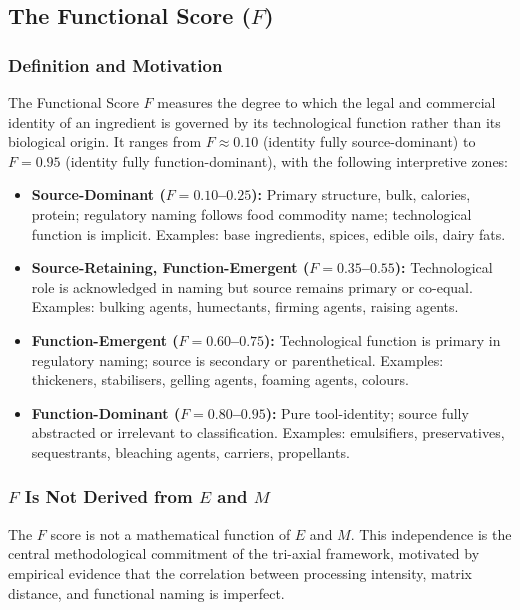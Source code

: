 \documentclass[12pt,a3paper]{article}
\begin{document}
\subsection{The Functional Score ($F$)}

\subsubsection{Definition and Motivation}

The Functional Score $F$ measures the degree to which the legal and commercial identity of an ingredient is governed by its technological function rather than its biological origin. It ranges from $F \approx 0.10$ (identity fully source-dominant) to $F = 0.95$ (identity fully function-dominant), with the following interpretive zones:

\begin{itemize}
  \item \textbf{Source-Dominant ($F = 0.10$--$0.25$):} Primary structure, bulk, calories, protein; regulatory naming follows food commodity name; technological function is implicit. Examples: base ingredients, spices, edible oils, dairy fats.

  \item \textbf{Source-Retaining, Function-Emergent ($F = 0.35$--$0.55$):} Technological role is acknowledged in naming but source remains primary or co-equal. Examples: bulking agents, humectants, firming agents, raising agents.

  \item \textbf{Function-Emergent ($F = 0.60$--$0.75$):} Technological function is primary in regulatory naming; source is secondary or parenthetical. Examples: thickeners, stabilisers, gelling agents, foaming agents, colours.

  \item \textbf{Function-Dominant ($F = 0.80$--$0.95$):} Pure tool-identity; source fully abstracted or irrelevant to classification. Examples: emulsifiers, preservatives, sequestrants, bleaching agents, carriers, propellants.
\end{itemize}

\subsubsection{$F$ Is Not Derived from $E$ and $M$}

The $F$ score is not a mathematical function of $E$ and $M$. This independence is the central methodological commitment of the tri-axial framework, motivated by empirical evidence that the correlation between processing intensity, matrix distance, and functional naming is imperfect.
\end{document}
